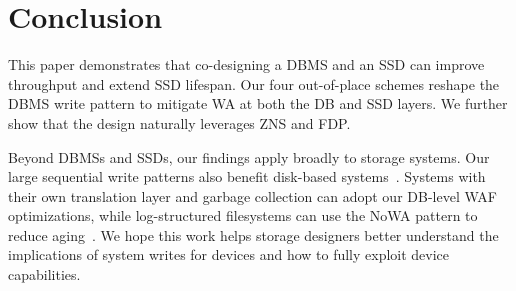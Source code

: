 \section{Conclusion}\label{sec:conclusion}
This paper demonstrates that co-designing a DBMS and an SSD can improve throughput and extend SSD lifespan.
Our four out-of-place schemes reshape the DBMS write pattern to mitigate WA at both the DB and SSD layers. %
We further show that the design naturally leverages ZNS and FDP.

Beyond DBMSs and SSDs, our findings apply broadly to storage systems.
Our large sequential write patterns also benefit disk-based systems~\cite{DBLP:journals/corr/abs-2205-11753,DBLP:conf/sosp/BornholtJACKMSS21,skylight}.
Systems with their own translation layer and garbage collection can adopt our DB-level WAF optimizations, 
while log-structured filesystems can use the NoWA pattern to reduce aging~\cite{DBLP:conf/hotstorage/ParkE22,DBLP:conf/usenix/KadekodiNG18}.
We hope this work helps storage designers better understand the implications of system writes for devices and how to fully exploit device capabilities.
